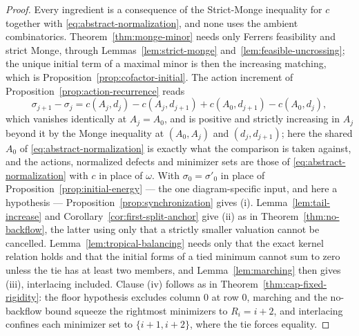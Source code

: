 \documentclass[11pt,a4paper]{amsart}
\numberwithin{equation}{section}
\theoremstyle{plain}
\theoremstyle{definition}
\begin{document}
\begin{proof}
Every ingredient is a consequence of the Strict-Monge inequality for \(c\)
together with \eqref{eq:abstract-normalization}, and none uses the ambient
combinatorics.  Theorem~\ref{thm:monge-minor} needs only Ferrers feasibility and
strict Monge, through Lemmas~\ref{lem:strict-monge}
and~\ref{lem:feasible-uncrossing}; the unique initial term of a maximal minor is
then the increasing matching, which is Proposition~\ref{prop:cofactor-initial}.
The action increment of Proposition~\ref{prop:action-recurrence} reads
\[
\sigma_{j+1}-\sigma_j
=
c(A_j,d_j)-c(A_j,d_{j+1})+c(A_0,d_{j+1})-c(A_0,d_j),
\]
which vanishes identically at \(A_j=A_0\), and is positive and strictly
increasing in \(A_j\) beyond it by the Monge inequality at \((A_0,A_j)\) and
\((d_j,d_{j+1})\); here the shared \(A_0\) of
\eqref{eq:abstract-normalization} is exactly what the comparison is taken
against, and the actions, normalized defects and minimizer sets are those of
\eqref{eq:abstract-normalization} with \(c\) in place of \(\omega\).  With \(\sigma_0=\sigma'_0\) in place of
Proposition~\ref{prop:initial-energy} --- the one diagram-specific input, and
here a hypothesis --- Proposition~\ref{prop:synchronization} gives (i).
Lemma~\ref{lem:tail-increase} and Corollary~\ref{cor:first-split-anchor} give
(ii) as in Theorem~\ref{thm:no-backflow}, the latter using only that a strictly
smaller valuation cannot be cancelled.
Lemma~\ref{lem:tropical-balancing} needs only that the exact kernel relation
holds and that the initial forms of a tied minimum cannot sum to zero unless the
tie has at least two members, and Lemma~\ref{lem:marching} then gives (iii),
interlacing included.  Clause (iv) follows as in
Theorem~\ref{thm:cap-fixed-rigidity}: the floor hypothesis excludes column \(0\)
at row \(0\), marching and the no-backflow bound squeeze the rightmost
minimizers to \(R_i=i+2\), and interlacing confines each minimizer set to
\(\{i+1,i+2\}\), where the tie forces equality.
\end{proof}
\end{document}

